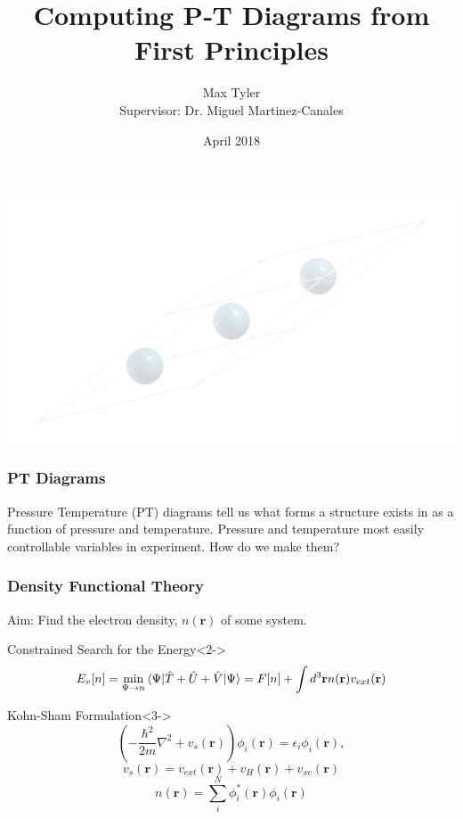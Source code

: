 \documentclass{beamer}
\title{Computing P‐T Diagrams from First Principles}
\author[Max Tyler]{Max Tyler\\{\small Supervisor: Dr. Miguel Martinez-Canales}}
\institute{The University of Edinburgh}
\date{April 2018}
\begin{document}
{ 
\usebackgroundtemplate
{
	\includegraphics[width=\paperwidth,height=\paperheight]{na9rlarge.png}
}
\frame{\titlepage}
}
 
\begin{frame}
	\frametitle{PT Diagrams}
	Pressure Temperature (PT) diagrams tell us what forms a structure exists in as a function of pressure and temperature.
	\pause
	\newline
	\newline
	Pressure and temperature most easily controllable variables in experiment.
	\pause
	\newline
	\newline
	How do we make them?
\end{frame}

\begin{frame}
	\frametitle{Density Functional Theory}
	Aim: Find the electron density, $n(\mathbf r)$ of some system.
	\begin{block}{Constrained Search for the Energy}<2->
		$$E_{v}[n] = \min_{\Psi \rightarrow n} \braket{\Psi|\hat T+\hat U + \hat V|\Psi} = F[n] + \int d^3\mathbf r n(\mathbf r) v_{ext}(\mathbf r)$$
	\end{block}
	\begin{block}{Kohn-Sham Formulation}<3->
		$$\left(-\frac{\hbar^2}{2m}\nabla^2+v_s(\mathbf r)\right)\phi_i(\mathbf r) = \epsilon_i \phi_i(\mathbf r),$$
		$$v_s(\mathbf r) = v_{ext}(\mathbf r) + v_H(\mathbf r) + v_{xc}(\mathbf r)$$
		$$n(\mathbf r) = \sum_i^N\phi^*_i(\mathbf r)\phi_i(\mathbf r)$$	
	\end{block}
\end{frame}
\end{document}
